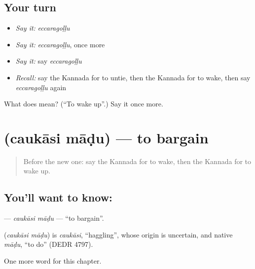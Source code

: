 \subsection*{Your turn}
\begin{itemize}
\raggedright
  \item \emph{Say it:} \emph{eccaragoḷḷu}
  \item \emph{Say it:} \emph{eccaragoḷḷu}, once more
  \item \emph{Say it:} say \emph{eccaragoḷḷu}
  \item \emph{Recall:} say the Kannada for to untie, then the Kannada for to wake, then say \emph{eccaragoḷḷu} again
\end{itemize}

\begin{tcolorbox}[breakable,colback=teal!4,colframe=teal!35!black,title={Before you move on}]
What does  mean? (\textquotedblleft{}To wake up\textquotedblright{}.) Say it once more.
\end{tcolorbox}
\section[\texorpdfstring{\kn{ಚೌಕಾಸಿ} \kn{ಮಾಡು} (caukāsi māḍu)}{ಚೌಕಾಸಿ ಮಾಡು (caukāsi māḍu)}]{  (caukāsi māḍu) — to bargain}

\label{lesson:KA-C236-caukasi-madu}



\begin{quote}
Before the new one: say the Kannada for to wake, then the Kannada for to wake up.
\end{quote}

\subsection*{You'll want to know:  }
\textbf{ } — \emph{caukāsi māḍu} — \textquotedblleft{}to bargain\textquotedblright{}.

\begin{cousinweb}
\textbf{ } (\emph{caukāsi māḍu}) is \emph{caukāsi}, \textquotedblleft{}haggling\textquotedblright{}, whose origin is uncertain, and native \emph{māḍu}, \textquotedblleft{}to do\textquotedblright{} (DEDR 4797).
\end{cousinweb}

\begin{grammarlens}[title={What you've built}]
One more word for this chapter.
\end{grammarlens}

